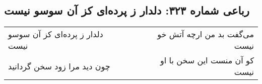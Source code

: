 \begin{center}
\section*{رباعی شماره ۳۲۳: دلدار ز پرده‌ای کز آن سوسو نیست}
\label{sec:0323}
\begin{longtable}{l p{0.5cm} r}
دلدار ز پرده‌ای کز آن سوسو نیست
&&
می‌گفت بد من ارچه آتش خو نیست
\\
چون دید مرا زود سخن گردانید
&&
کو آن منست این سخن با او نیست
\\
\end{longtable}
\end{center}

